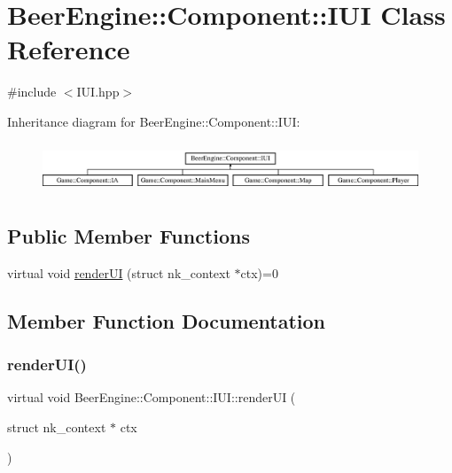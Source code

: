 \hypertarget{class_beer_engine_1_1_component_1_1_i_u_i}{}\section{Beer\+Engine\+:\+:Component\+:\+:I\+UI Class Reference}
\label{class_beer_engine_1_1_component_1_1_i_u_i}


{\ttfamily \#include $<$I\+U\+I.\+hpp$>$}

Inheritance diagram for Beer\+Engine\+:\+:Component\+:\+:I\+UI\+:\begin{figure}[H]
\begin{center}
\leavevmode
\includegraphics[height=1.497326cm]{class_beer_engine_1_1_component_1_1_i_u_i}
\end{center}
\end{figure}
\subsection*{Public Member Functions}
\begin{DoxyCompactItemize}
\item 
virtual void \mbox{\hyperlink{class_beer_engine_1_1_component_1_1_i_u_i_a4a049b1749c1bce80e1fd63538e9fae3}{render\+UI}} (struct nk\+\_\+context $\ast$ctx)=0
\end{DoxyCompactItemize}


\subsection{Member Function Documentation}
\mbox{\label{class_beer_engine_1_1_component_1_1_i_u_i_a4a049b1749c1bce80e1fd63538e9fae3}} 
\subsubsection{\texorpdfstring{render\+U\+I()}{renderUI()}}
{\footnotesize\ttfamily virtual void Beer\+Engine\+::\+Component\+::\+I\+U\+I\+::render\+UI (\begin{DoxyParamCaption}\item[{struct nk\+\_\+context $\ast$}]{ctx }\end{DoxyParamCaption})\hspace{0.3cm}{\ttfamily [pure virtual]}}



